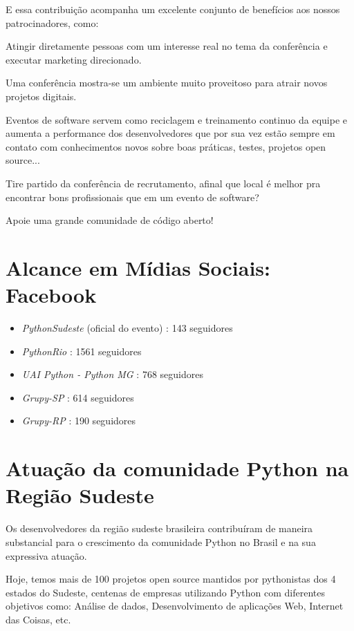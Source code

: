 \documentclass[12pt]{article}
\begin{document}
E essa contribuição acompanha um excelente conjunto de benefícios aos nossos patrocinadores, como:
\begin{description}[align=right,labelwidth=4cm]
    \item [Visibilidade:] Atingir diretamente pessoas com um interesse real no tema da conferência e executar marketing direcionado.
    \item [Oportunidades:] Uma conferência mostra-se um ambiente muito proveitoso para atrair novos projetos digitais.
    \item [Produtividade:] Eventos de software servem como reciclagem e treinamento continuo da equipe e aumenta a performance dos desenvolvedores que por sua vez estão sempre em contato com conhecimentos novos sobre boas práticas, testes, projetos open source...
    \item [Contratação:] Tire partido da conferência de recrutamento, afinal que local é melhor pra encontrar bons profissionais que em um evento de software?
    \item [Patrocínio:] Apoie uma grande comunidade de código aberto!
\end{description}

\section{Alcance em Mídias Sociais: Facebook}
\begin{itemize}[label={}]
    \item \emph{PythonSudeste} (oficial do evento) : 143 seguidores
    \item \emph{PythonRio} : 1561 seguidores
    \item \emph{UAI Python - Python MG } : 768 seguidores
    \item \emph{Grupy-SP} :  614 seguidores
    \item \emph{Grupy-RP} : 190 seguidores
\end{itemize}

\section{Atuação da comunidade Python na Região Sudeste}

Os desenvolvedores da região sudeste brasileira contribuíram de maneira substancial para o crescimento da comunidade Python no Brasil e na sua expressiva atuação.

Hoje, temos mais de 100 projetos open source mantidos por pythonistas dos 4 estados do Sudeste, centenas de empresas utilizando Python com diferentes objetivos como: Análise de dados, Desenvolvimento de aplicações Web, Internet das Coisas, etc.
\end{document}
